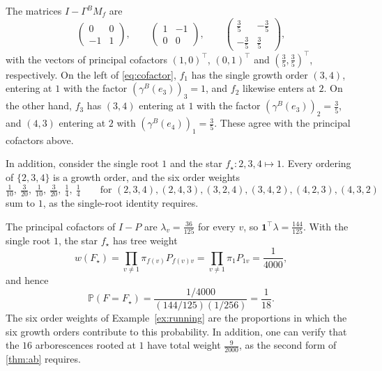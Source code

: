 \documentclass[onefignum,onetabnum]{siamart250211}
\numberwithin{theorem}{section}
\numberwithin{equation}{section}
\newcommand{\pr}{\mathbb{P}}
\newcommand{\one}{\mathbf{1}}
\begin{document}
\begin{example}
The matrices
$I-\Gamma^BM_f$ are
\[
\begin{pmatrix}0&0\\-1&1\end{pmatrix},\qquad
\begin{pmatrix}1&-1\\0&0\end{pmatrix},\qquad
\begin{pmatrix}\tfrac35&-\tfrac35\\[2pt]-\tfrac35&\tfrac35\end{pmatrix},
\]
with the vectors of principal cofactors $(1,0)^\top$, $(0,1)^\top$ and $(\tfrac35,\tfrac35)^\top$,
respectively. On the left of \eqref{eq:cofactor}, $f_1$ has the single growth order
$(3,4)$, entering at $1$ with the factor $(\gamma^{B}(e_3))_3=1$, and
$f_2$ likewise enters at $2$. On the other hand, $f_3$ has $(3,4)$
entering at $1$ with the factor $(\gamma^{B}(e_3))_2=\tfrac35$, and
$(4,3)$ entering at $2$ with $(\gamma^{B}(e_4))_1=\tfrac35$. These agree
with the principal cofactors above. 

In addition, consider the single root $1$ and the star
$f_\star:2,3,4\mapsto1$. Every ordering of $\{2,3,4\}$ is a growth
order, and the six order weights
\[
\tfrac1{10},\ \tfrac3{20},\ \tfrac1{10},\ \tfrac3{20},\ \tfrac14,\ \tfrac14
\qquad\text{for }(2,3,4),(2,4,3),(3,2,4),(3,4,2),(4,2,3),(4,3,2)
\]
sum to $1$, as the single-root identity requires.
\end{example}

\begin{example}\label{ex:ab}
The principal cofactors of $I-P$ are $\lambda_v=\tfrac{36}{125}$ for
every $v$, so $\one^{\top}\lambda=\tfrac{144}{125}$. With the single
root $1$, the star $f_\star$ has tree weight
\[
w(F_\star)=\prod_{v\ne1}\pi_{f(v)}P_{f(v)v}=\prod_{v\ne1}\pi_1P_{1v}=\frac{1}{4000},
\]
and hence
\[
\pr(F=F_\star)=\frac{1/4000}{(144/125)(1/256)}=\frac1{18}.
\]
The six order weights of Example~\ref{ex:running} are the proportions in which the six
growth orders contribute to this probability. In addition, one can verify that the $16$
arborescences rooted at $1$ have total weight $\tfrac9{2000}$, as the
second form of \cref{thm:ab} requires.
\end{example}
\end{document}
